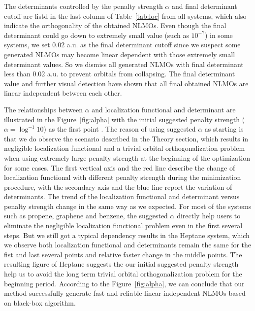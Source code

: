 \documentclass[aps,prl,reprint,amsmath,amssymb]{revtex4-1}
\begin{document}

The determinants controlled by the penalty strength $\alpha$ and final determinant cutoff are listd in the last column of Table~\ref{tab:loc} from all systems, which also indicate the orthogonality of the obtained NLMOs.
Even though the final determinant could go down to extremely small value (such as $10^{-7}$) in some systems, we set 0.02 a.u. as the final determinant cutoff since we suspect some generated NLMOs may become linear dependent with those extremely small determinant values.
So we dismiss all generated NLMOs with final determinant less than 0.02 a.u. to prevent orbitals from collapsing.
The final determinant value and further visual detection have shown that all final obtained NLMOs are linear independent between each other.

The relationships between $\alpha$ and localization functional and determinant are illustrated in the Figure~\ref{fig:alpha} with the initial suggested penalty strength ($\alpha = \log^{-1} 10$) as the first point .
The reason of using suggested $\alpha$ as starting is that we do observe the scenario described in the Theory section, which results in negligible localization functional and a trivial orbital orthogonalization problem when using extremely large penalty strength at the beginning of the optimization for some cases.
The first vertical axis and the red line describe the change of localization functional with different penalty strength during the minimization procedure, with the secondary axis and the blue line report the variation of determinants. 
The trend of the localization functional and determinant versus penalty strength change in the same way as we expected.
For most of the systems such as propene, graphene and benzene, the suggested $\alpha$ directly help users to eliminate the  negligible localization functional problem even in the first several steps.  
But we still got a typical dependency results in the Heptane system, which we observe both localization functional and determinants remain the same for the fist and last several points and relative faster change in the middle points.
The resulting figure of Heptane suggests the our initial suggested penalty strength help us to avoid the long term trivial orbital orthogonalization problem for the beginning period.
According to the Figure~\ref{fig:alpha}, we can conclude that our method successfully generate fast and reliable linear independent NLMOs based on black-box algorithm.
\end{document}
